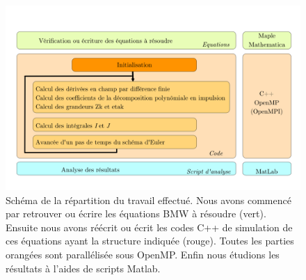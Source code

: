 \documentclass[10pt]{article}
\begin{document}
\begin{figure}[H]
	\begin{center}
		\includegraphics[width=0.95\columnwidth]{Diagramme_Code_2.pdf}
		\caption{Schéma de la répartition du travail effectué. Nous avons commencé par retrouver ou écrire les équations BMW à résoudre (vert). Ensuite nous avons réécrit ou écrit les codes C++ de simulation de ces équations ayant la structure indiquée (rouge). Toutes les parties orangées sont parallélisée sous OpenMP. Enfin nous étudions les résultats à l'aides de scripts Matlab.}
		\label{fig:org}
	\end{center}
\end{figure}
\end{document}
